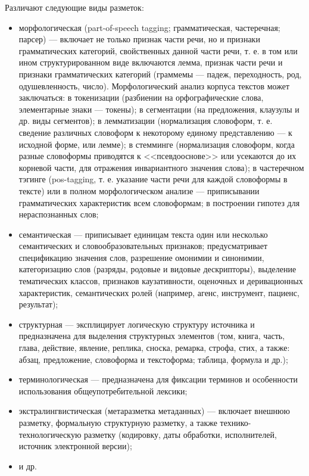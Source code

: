 Различают следующие виды разметок:
\begin{itemize}
    \item морфологическая (part-of-speech tagging; грамматическая, частеречная; парсер) --- включает не только признак части речи, но и признаки грамматических категорий, свойственных данной части речи, т. е. в том или ином структурированном виде включаются лемма, признак части речи и признаки грамматических категорий (граммемы --- падеж, переходность, род, одушевленность, число). Морфологический анализ корпуса текстов может заключаться: в токенизации (разбиении на орфографические слова, элементарные знаки --- токены); в сегментации (на предложения, клаузулы и др. виды сегментов); в лемматизации (нормализация словоформ, т. е. сведение различных словоформ к некоторому единому представлению --- к исходной форме, или лемме); в стемминге (нормализация словоформ, когда разные словоформы приводятся к <<псевдооснове>> или усекаются до их корневой части, для отражения инвариантного значения слова); в частеречном тэгинге (pos-tagging, т. е. указание части речи для каждой словоформы в тексте) или в полном морфологическом анализе --- приписывании грамматических характеристик всем словоформам; в построении гипотез для нераспознанных слов; 
    \item семантическая --- приписывает единицам текста один или несколько семантических и словообразовательных признаков; предусматривает спецификацию значения слов, разрешение омонимии и синонимии, категоризацию слов (разряды, родовые и видовые дескрипторы), выделение тематических классов, признаков каузативности, оценочных и деривационных характеристик, семантических ролей (например, агенс, инструмент, пациенс, результат);
    \item структурная --- эксплицирует логическую структуру источника и предназначена для выделения структурных элементов (том, книга, часть, глава, действие, явление, реплика, сноска, ремарка, строфа, стих, а также: абзац, предложение, словоформа и текстоформа; таблица, формула и др.);
    \item терминологическая --- предназначена для фиксации терминов и особенности использования общеупотребительной лексики;
    \item экстралингвистическая (метаразметка метаданных) --- включает внешнюю разметку, формальную структурную разметку, а также технико-технологическую разметку (кодировку, даты обработки, исполнителей, источник электронной версии);
    \item и др.~\cite{lesnikov2019}
\end{itemize}

